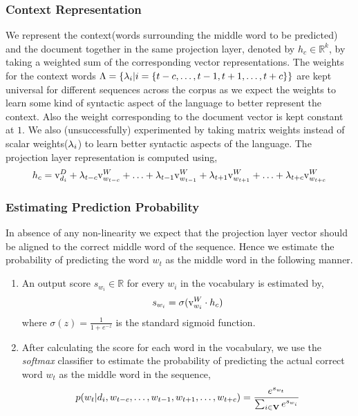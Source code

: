 \subsubsection{Context Representation}
We represent the context(words surrounding the middle word to be predicted) and the document together in the same projection layer, denoted by $h_{c} \in \mathbb{R}^{k}$, by taking a weighted sum of the corresponding vector representations. 
The weights for the context words $\Lambda = \{\lambda_{i} | i=\{t-c, \ldots, t-1, t+1, \ldots, t+c\}\}$ are kept universal for different sequences across the corpus as we expect the weights to learn some kind of syntactic aspect of the language to better represent the context. Also the weight corresponding to the document vector is kept constant at $1$. 
We also (unsuccessfully) experimented by taking matrix weights instead of scalar weights($\lambda_{i}$) to learn better syntactic aspects of the language. 
The projection layer representation is computed using,
\begin{equation}
\label{eq:hidden_vec}
h_{c} = \mathrm{v}^{D}_{d_{i}} + \lambda_{t-c}\mathrm{v}^{W}_{w_{t-c}} + \ldots + \lambda_{t-1}\mathrm{v}^{W}_{w_{t-1}} + \lambda_{t+1}\mathrm{v}^{W}_{w_{t+1}} + \ldots + \lambda_{t+c}\mathrm{v}^{W}_{w_{t+c}}
\end{equation}

\subsubsection{Estimating Prediction Probability}
In absence of any non-linearity we expect that the projection layer vector should be aligned to the correct middle word of the sequence. Hence we estimate the probability of predicting the word $w_{t}$ as the middle word in the following manner. 
\begin{enumerate}
\item An output score $s_{w_{i}} \in \mathbb{R}$ for every $w_{i}$ in the vocabulary is estimated by,
\begin{equation}
\label{eq:nn_score}
s_{w_{i}} = \sigma(\mathrm{v}^{W}_{w_{i}}\cdot h_{c})
\end{equation}
where $\sigma(z) = \frac{1}{1+e^{-z}}$ is the standard sigmoid function. 
\item After calculating the score for each word in the vocabulary, we use the \emph{softmax} classifier to estimate the probability of predicting the actual correct word $w_{t}$ as the middle word in the sequence,
\begin{equation}
\label{eq:soft_prob}
p(w_{t} | d_{i}, w_{t-c}, \ldots, w_{t-1}, w_{t+1}, \ldots, w_{t+c}) = \frac{e^{s_{w_{t}}}}{\sum_{i \in \mathbf{V}} e^{s_{w_{i}}}}
\end{equation}
\end{enumerate}

